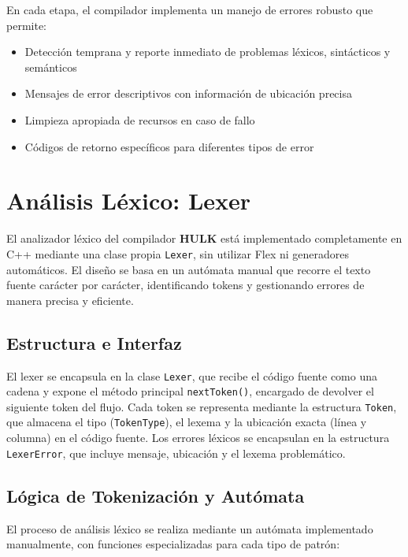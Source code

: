 \documentclass[11pt, a4paper, twoside]{article} %
\begin{document}
En cada etapa, el compilador implementa un manejo de errores robusto que permite:
\begin{itemize}
    \item Detección temprana y reporte inmediato de problemas léxicos, sintácticos y semánticos
    \item Mensajes de error descriptivos con información de ubicación precisa
    \item Limpieza apropiada de recursos en caso de fallo
    \item Códigos de retorno específicos para diferentes tipos de error
\end{itemize}


\section{Análisis Léxico: Lexer}

El analizador léxico del compilador \textbf{HULK} está implementado completamente en C++ mediante una clase propia \texttt{Lexer}, sin utilizar Flex ni generadores automáticos. El diseño se basa en un autómata manual que recorre el texto fuente carácter por carácter, identificando tokens y gestionando errores de manera precisa y eficiente.

\subsection{Estructura e Interfaz}

El lexer se encapsula en la clase \texttt{Lexer}, que recibe el código fuente como una cadena y expone el método principal \texttt{nextToken()}, encargado de devolver el siguiente token del flujo. Cada token se representa mediante la estructura \texttt{Token}, que almacena el tipo (\texttt{TokenType}), el lexema y la ubicación exacta (línea y columna) en el código fuente. Los errores léxicos se encapsulan en la estructura \texttt{LexerError}, que incluye mensaje, ubicación y el lexema problemático.

\subsection{Lógica de Tokenización y Autómata}

El proceso de análisis léxico se realiza mediante un autómata implementado manualmente, con funciones especializadas para cada tipo de patrón:
\end{document}
